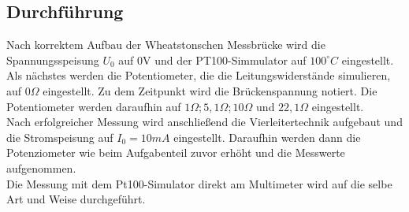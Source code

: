 \documentclass[a4paper,11pt,oneside]{article}
\begin{document}
\newpage

\subsection{Durchführung}
Nach korrektem Aufbau der Wheatstonschen Messbrücke wird die Spannungsspeisung $U_0$ auf 0V und der PT100-Simmulator auf $100^\circ C$ eingestellt. Als nächstes werden die Potentiometer, die die Leitungswiderstände simulieren, auf $0\Omega$ eingestellt. Zu dem Zeitpunkt wird die Brückenspannung notiert. Die Potentiometer werden daraufhin auf $ 1\Omega; 5,1\Omega; 10\Omega $ und $ 22,1\Omega$ eingestellt.\\
Nach erfolgreicher Messung wird anschließend die Vierleitertechnik  aufgebaut und die Stromspeisung auf $I_0=10mA$ eingestellt. Daraufhin werden dann die Potenziometer wie beim Aufgabenteil zuvor erhöht und die Messwerte aufgenommen.\\
Die Messung mit dem Pt100-Simulator direkt am Multimeter wird auf die selbe Art und Weise durchgeführt. 
\end{document}
